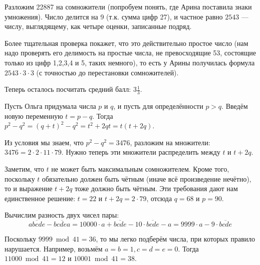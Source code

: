 \begin{itemize}
\itA Разложим 22887 на сомножители (попробуем понять, где Арина поставила знаки умножения). 
Число делится на 9 (т.к. сумма цифр 27), и
частное равно $2543$ --- числу, выглядящему, как четыре оценки, записанные подряд.

Более тщательная проверка покажет, что это действительно простое число (нам надо проверять его
делимость на простые числа, не превосходящие 53, состоящие только из цифр 1,2,3,4 и 5, таких немного),
то есть у Арины получилась формула $2543 \cdot 3 \cdot 3$ (с точностью до перестановки сомножителей).

Теперь осталось посчитать средний балл: $3\frac{1}{3}$.

\itB Пусть Ольга придумала числа $p$ и $q$, и пусть для определённости $p > q$. Введём новую
переменную $t = p - q$. Тогда $p^2 - q^2 = (q + t)^2 - q^2 = t^2 + 2qt = t(t + 2q)$.

Из условия мы знаем, что $p^2 - q^2 = 3476$, разложим на множители: 
$3476 = 2\cdot 2\cdot 11 \cdot 79$. 
Нужно теперь эти множители распределить между $t$ и $t+2q$. 

Заметим, что $t$ не может быть максимальным сомножителем. Кроме того, поскольку $t$ обязательно 
должен быть чётным (иначе всё произведение нечётно), то и выражение $t+2q$ тоже должно быть
чётным. Эти требования дают нам единственное решение: $t = 22$ и $t + 2q = 2 \cdot 79$,
отсюда $q = 68$ и $p = 90$.

\itC 

Вычислим разность двух чисел пары:
$$\overline{abcde} - \overline{bcdea} = 10000\cdot a + \overline{bcde} - 10\cdot\overline{bcde} - a = 9999\cdot a - 9 \cdot\overline{bcde}$$

Поскольку $9999 \bmod 41 = 36$, то мы легко подберём числа, при которых правило нарушается.
Например, возьмём $a = b = 1, c = d = e = 0$. Тогда $11000 \bmod 41 = 12$ и $10001 \bmod 41 = 38$.

\end{itemize}
